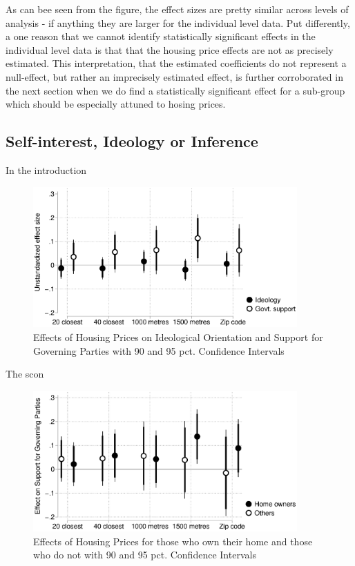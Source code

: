 \documentclass[12pt,a4paper]{article}
\begin{document}
As can bee seen from the figure, the effect sizes are pretty similar across levels of analysis - if anything they are larger for the individual level data. Put differently, a one reason that we cannot identify statistically significant effects in the individual level data is that that the housing price effects are not as precisely estimated. This interpretation, that the estimated coefficients do not represent a null-effect, but rather an imprecisely estimated effect, is further corroborated in the next section when we do find a statistically significant effect for a sub-group which should be especially attuned to hosing prices.

\subsection{Self-interest, Ideology or Inference}\label{inference}

In the introduction



\begin{figure}[htbp!]
	\includegraphics[width=0.9\textwidth]{../figures/ideology.eps}
	\centering
	\caption{Effects of Housing Prices on Ideological Orientation and Support for Governing Parties with 90  and 95 pct. Confidence Intervals}\label{ideology}
\end{figure}


The scon

\begin{figure}[htbp!]
	\includegraphics[width=0.9\textwidth]{../figures/homeown.eps}
	\centering
	\caption{Effects of Housing Prices for those who own their home and those who do not with 90  and 95 pct. Confidence Intervals}\label{homeown}
\end{figure}
\end{document}

